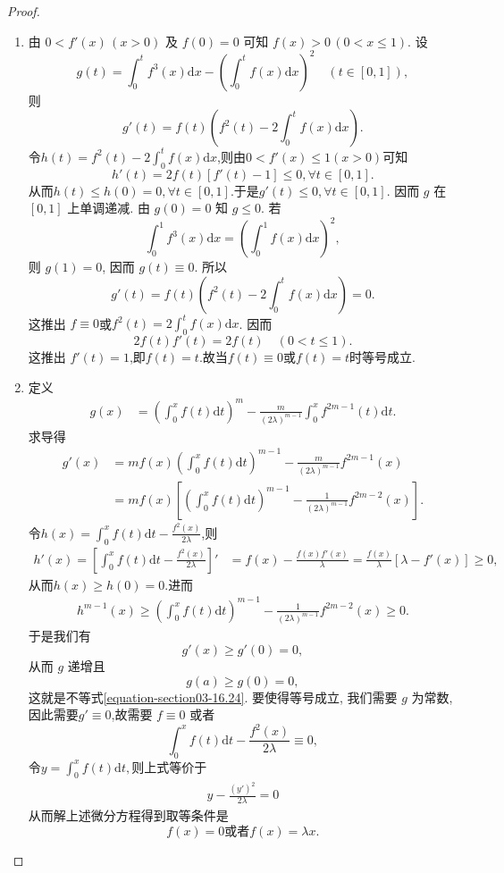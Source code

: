 \documentclass[../../main.tex]{subfiles}%
\begin{document}
\begin{proof}
\begin{enumerate}
\item 由 $0<f'(x)\,(x>0)$ 及 $f(0)=0$ 可知 $f(x)>0\,(0<x\leqslant 1)$. 设
$$g(t)=\int_0^t f^3(x)\mathrm{d}x-\left(\int_0^t f(x)\mathrm{d}x\right)^2\quad(t\in[0,1]),$$
则
$$g'(t)=f(t)\left(f^2(t)-2\int_0^t f(x)\mathrm{d}x\right).$$
令$h(t)=f^2(t)-2\int_0^t f(x)\mathrm{d}x$,则由$0<f'(x)\leqslant 1(x>0)$可知
\[
h' \left( t \right) =2f\left( t \right) \left[ f' \left( t \right) -1 \right] \leqslant 0,\forall t\in \left[ 0,1 \right] .
\]
从而$h(t)\leqslant h(0)=0,\forall t\in \left[ 0,1 \right] $.于是$g'(t)\leqslant 0,\forall t\in \left[ 0,1 \right]$.
因而 $g$ 在 $[0,1]$ 上单调递减. 由 $g(0)=0$ 知 $g\leqslant 0$. 若
$$\int_0^1 f^3(x)\mathrm{d}x=\left(\int_0^1 f(x)\mathrm{d}x\right)^2,$$
则 $g(1)=0$, 因而 $g(t)\equiv0$. 所以
$$g'(t)=f(t)\left(f^2(t)-2\int_0^t f(x)\mathrm{d}x\right)=0.$$
这推出 $f\equiv 0$或$f^2(t)=2\int_0^t f(x)\mathrm{d}x$. 因而
$$2f(t)f'(t)=2f(t)\quad(0<t\leqslant 1).$$
这推出 $f'(t)=1$,即$f(t)=t$.故当$f(t)\equiv 0$或$f(t)=t$时等号成立.

\item 定义
\begin{align*}
g(x) &= \left(\int_{0}^{x}f(t)\mathrm{d}t\right)^m - \frac{m}{(2\lambda)^{m - 1}}\int_{0}^{x}f^{2m - 1}(t)\mathrm{d}t.
\end{align*}
求导得
\begin{align*}
g'(x) &= mf(x)\left(\int_{0}^{x}f(t)\mathrm{d}t\right)^{m - 1} - \frac{m}{(2\lambda)^{m - 1}}f^{2m - 1}(x)\\
&= mf(x)\left[\left(\int_{0}^{x}f(t)\mathrm{d}t\right)^{m - 1} - \frac{1}{(2\lambda)^{m - 1}}f^{2m - 2}(x)\right].
\end{align*}
令$h(x)=\int_{0}^{x}f(t)\mathrm{d}t - \frac{f^2(x)}{2\lambda}$,则
\begin{align*}
h'(x)=\left[\int_{0}^{x}f(t)\mathrm{d}t - \frac{f^2(x)}{2\lambda}\right]' &= f(x) - \frac{f(x)f'(x)}{\lambda} = \frac{f(x)}{\lambda}[\lambda - f'(x)] \geqslant 0,
\end{align*}
从而$h(x)\geqslant  h(0)=0.$进而
\begin{align*}
h^{m-1}(x)\geqslant \left(\int_{0}^{x}f(t)\mathrm{d}t\right)^{m - 1} - \frac{1}{(2\lambda)^{m - 1}}f^{2m - 2}(x)\geqslant 0.
\end{align*}
于是我们有
\[g'(x) \geqslant g'(0) = 0,\]
从而 $g$ 递增且
\[g(a) \geqslant g(0) = 0,\]
这就是不等式\eqref{equation-section03-16.24}.
要使得等号成立, 我们需要 $g$ 为常数, 因此需要$g'\equiv 0$,故需要 $f \equiv 0$ 或者
\[\int_{0}^{x}f(t)\mathrm{d}t - \frac{f^2(x)}{2\lambda} \equiv 0,\]
令$y=\int_{0}^{x}f(t)\mathrm{d}t,$则上式等价于
\begin{align*}
y-\frac{(y')^2}{2\lambda}=0
\end{align*}
从而解上述微分方程得到取等条件是
\[f(x) = 0\text{或者}f(x) = \lambda x.\]
\end{enumerate}
\end{proof}
\end{document}

